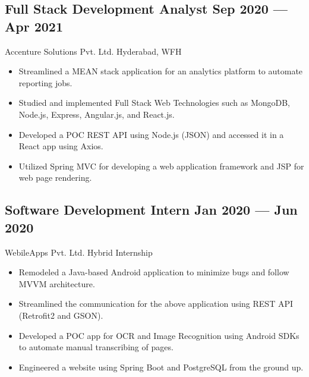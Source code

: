 \documentclass[a4,10pt]{article}
\newcommand{\subtext}[1]{
#1\par\vspace{-0.2cm}}
\newenvironment{zitemize}{
\begin{itemize}\itemsep0pt \parskip0pt \parsep1pt}
{\end{itemize}\vspace{-0.5cm}}
\begin{document}
        

\subsection*{Full Stack Development Analyst \hfill Sep 2020 --- Apr 2021} 
\subtext{Accenture Solutions Pvt. Ltd. \hfill Hyderabad, WFH} 
    \begin{zitemize}
        \item Streamlined a MEAN stack application for an analytics platform to automate reporting jobs.
        \item Studied and implemented Full Stack Web Technologies such as MongoDB, Node.js, Express, Angular.js, and React.js.
        \item Developed a POC REST API using Node.js (JSON) and accessed it in a React app using Axios.
        \item Utilized Spring MVC for developing a web application framework and JSP for web page rendering.
    \end{zitemize}
    
\subsection*{Software Development Intern \hfill Jan 2020 --- Jun 2020} 
\subtext{WebileApps Pvt. Ltd. \hfill Hybrid Internship} 
    \begin{zitemize}
        \item Remodeled a Java-based Android application to minimize bugs and follow MVVM architecture.
        \item Streamlined the communication for the above application using REST API (Retrofit2 and GSON).
        \item Developed a POC app for OCR and Image Recognition using Android SDKs to automate manual transcribing of pages.
        \item Engineered a website using Spring Boot and PostgreSQL from the ground up.
    \end{zitemize}
\end{document}
